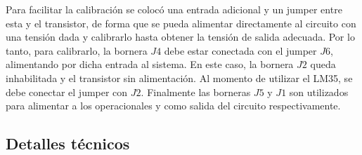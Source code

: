 \documentclass[a4paper]{article}
\begin{document}
Para facilitar la calibración se colocó una entrada adicional y un jumper entre esta y el transistor, de forma que se pueda alimentar directamente al circuito con una tensión dada y calibrarlo hasta obtener la tensión de salida adecuada. Por lo tanto, para calibrarlo, la bornera $J4$ debe estar conectada con el jumper $J6$, alimentando por dicha entrada al sistema. En este caso, la bornera $J2$ queda inhabilitada y el transistor sin alimentación.
Al momento de utilizar el LM35, se debe conectar el jumper con $J2$.
Finalmente las borneras $J5$ y $J1$ son utilizados para alimentar a los operacionales y como salida del circuito respectivamente.

\subsection{Detalles técnicos}

\end{document}
